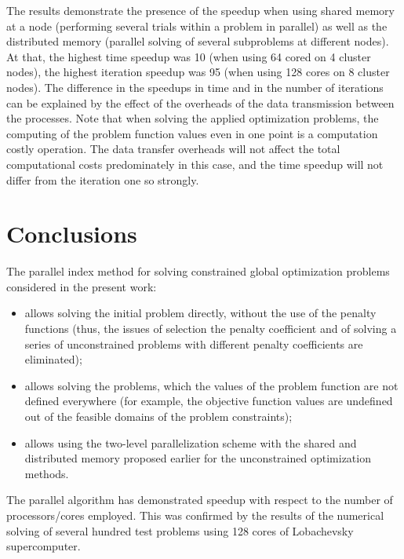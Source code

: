 \documentclass[smallextended]{svjour3}       %
\begin{document}
The results demonstrate the presence of the speedup when using shared memory at a node (performing several trials within a problem in parallel) as well as the distributed memory (parallel solving of several subproblems at different nodes). At that, the highest time speedup was 10 (when using 64 cored on 4 cluster nodes), the highest iteration speedup was 95 (when using 128 cores on 8 cluster nodes). The difference in the speedups in time and in the number of iterations can be explained by the effect of the overheads of the data transmission between the processes. Note that when solving the applied optimization problems, the computing of the problem function values even in one point is a computation costly operation. The data transfer overheads will not affect the total computational costs predominately in this case, and the time speedup will not differ from the iteration one so strongly.

\section{Conclusions}
\label{sec:5}

The parallel index method for solving constrained global optimization problems considered in the present work:
\begin{itemize}
	\item allows solving the initial problem directly, without the use of the penalty functions (thus, the issues of selection the penalty coefficient and of solving a series of unconstrained problems with different penalty coefficients are eliminated);
	\item allows solving the problems, which the values of the problem function are not defined everywhere (for example, the objective function values are undefined out of the feasible domains of the problem constraints);
	\item allows using the two-level parallelization scheme with the shared and distributed memory proposed earlier for the unconstrained optimization methods.
\end{itemize}

The parallel algorithm has demonstrated speedup with respect to the number of processors/cores employed. This was confirmed by the results of the numerical solving of several hundred test problems using 128 cores of Lobachevsky supercomputer. 
\end{document}
